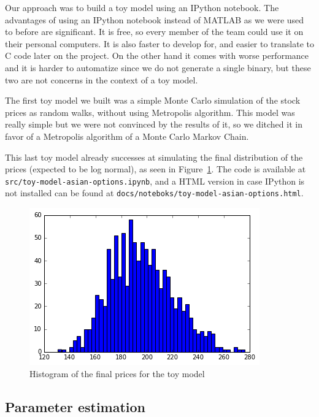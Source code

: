 \documentclass[%
 reprint,
 amsmath,amssymb,
 aps,
 nofootinbib,
 showpacs
]{revtex4-1}
\begin{document}
Our approach was to build a toy model using an IPython notebook.
The advantages of using an IPython notebook instead of MATLAB as we were used to before are significant.
It is free, so every member of the team could use it on their personal computers.
It is also faster to develop for, and easier to translate to C code later on the project.
On the other hand it comes with worse performance and it is harder to automatize since we do not generate a single binary, but these two are not concerns in the context of a toy model.

The first toy model we built was a simple Monte Carlo simulation of the stock prices as random walks, without using Metropolis algorithm.
This model was really simple but we were not convinced by the results of it, so we ditched it in favor of a Metropolis algorithm of a Monte Carlo Markov Chain.

This last toy model already successes at simulating the final distribution of the prices (expected to be log normal), as seen in Figure~\ref{fig:toymodel}.
The code is available at \texttt{src/toy-model-asian-options.ipynb}, and a HTML version in case IPython is not installed can be found at \texttt{docs/noteboks/toy-model-asian-options.html}.

\begin{figure}[ht]
  \centering
  \includegraphics[width=\linewidth]{../../graphs/toy_model_hist_final_prices}
  \caption{Histogram of the final prices for the toy model}
  \label{fig:toymodel}
\end{figure}

\subsection{Parameter estimation}
\end{document}
